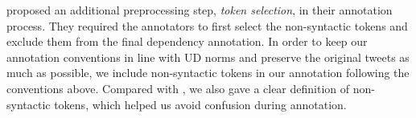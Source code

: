 \documentclass[11pt,a4paper]{article}
\begin{document}
 proposed an additional
preprocessing step, \emph{token selection}, in their annotation process.
They required the annotators to first select the non-syntactic
tokens and exclude them from the final dependency annotation.
In order to keep our annotation conventions in line with UD norms and preserve the original tweets as much as possible,
we include non-syntactic tokens in our annotation following the
conventions above. Compared with \citet{kong-EtAl:2014:EMNLP2014},
we also gave a clear %
definition of non-syntactic tokens, which helped
us avoid confusion during annotation.

\end{document}
